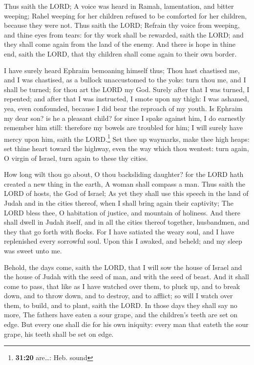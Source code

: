  Thus saith the LORD; A voice was heard in Ramah,
lamentation, and bitter weeping; Rahel weeping for her children refused
to be comforted for her children, because they were not. 
Thus saith the LORD; Refrain thy voice from weeping, and thine eyes from
tears: for thy work shall be rewarded, saith the LORD; and they shall
come again from the land of the enemy.  And there is hope
in thine end, saith the LORD, that thy children shall come again to
their own border.

 I have surely heard Ephraim bemoaning himself thus; Thou
hast chastised me, and I was chastised, as a bullock unaccustomed to the
yoke: turn thou me, and I shall be turned; for thou art the LORD my God.
 Surely after that I was turned, I repented; and after
that I was instructed, I smote upon my thigh: I was ashamed, yea, even
confounded, because I did bear the reproach of my youth. 
Is Ephraim my dear son? is he a pleasant child? for since I spake
against him, I do earnestly remember him still: therefore my bowels are
troubled for him; I will surely have mercy upon him, saith the
LORD.\footnote{\textbf{31:20} are\ldots: Heb. sound}  Set
thee up waymarks, make thee high heaps: set thine heart toward the
highway, even the way which thou wentest: turn again, O virgin of
Israel, turn again to these thy cities.

 How long wilt thou go about, O thou backsliding
daughter? for the LORD hath created a new thing in the earth, A woman
shall compass a man.  Thus saith the LORD of hosts, the
God of Israel; As yet they shall use this speech in the land of Judah
and in the cities thereof, when I shall bring again their captivity; The
LORD bless thee, O habitation of justice, and mountain of holiness.
 And there shall dwell in Judah itself, and in all the
cities thereof together, husbandmen, and they that go forth with flocks.
 For I have satiated the weary soul, and I have
replenished every sorrowful soul.  Upon this I awaked,
and beheld; and my sleep was sweet unto me.

 Behold, the days come, saith the LORD, that I will sow
the house of Israel and the house of Judah with the seed of man, and
with the seed of beast.  And it shall come to pass, that
like as I have watched over them, to pluck up, and to break down, and to
throw down, and to destroy, and to afflict; so will I watch over them,
to build, and to plant, saith the LORD.  In those days
they shall say no more, The fathers have eaten a sour grape, and the
children's teeth are set on edge.  But every one shall
die for his own iniquity: every man that eateth the sour grape, his
teeth shall be set on edge.

